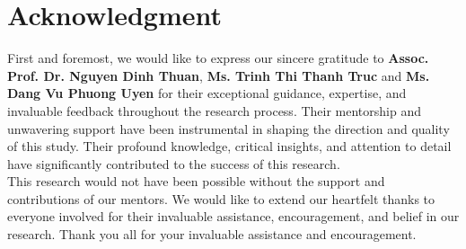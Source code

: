 \documentclass{ieeeojies}
\begin{document}
\section*{Acknowledgment}
First and foremost, we would like to express our sincere gratitude to \textbf{Assoc. Prof. Dr. Nguyen Dinh Thuan}, \textbf{Ms. Trinh Thi Thanh Truc} and \textbf{Ms. Dang Vu Phuong Uyen} for their exceptional guidance, expertise, and invaluable feedback throughout the research process. Their mentorship and unwavering support have been instrumental in shaping the direction and quality of this study. Their profound knowledge, critical insights, and attention to detail have significantly contributed to the success of this research.
\\This research would not have been possible without the support and contributions of our mentors. We would like to extend our heartfelt thanks to everyone involved for their invaluable assistance, encouragement, and belief in our research. Thank you all for your invaluable assistance and encouragement.
\end{document}
